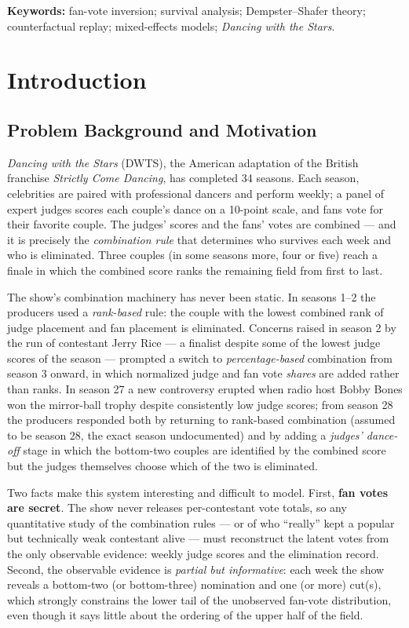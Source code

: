 \documentclass[10pt]{article}
\begin{document}
\textbf{Keywords:} fan-vote inversion; survival analysis; Dempster--Shafer theory;
counterfactual replay; mixed-effects models; \textit{Dancing with the Stars}.

\section{Introduction}

\subsection{Problem Background and Motivation}

\textit{Dancing with the Stars} (DWTS), the American adaptation of the British franchise
\textit{Strictly Come Dancing}, has completed 34 seasons. Each season, celebrities are
paired with professional dancers and perform weekly; a panel of expert judges scores each
couple's dance on a 10-point scale, and fans vote for their favorite couple. The judges'
scores and the fans' votes are combined --- and it is precisely the \emph{combination rule}
that determines who survives each week and who is eliminated. Three couples (in some
seasons more, four or five) reach a finale in which the combined score ranks the remaining
field from first to last.

The show's combination machinery has never been static. In seasons 1--2 the producers used
a \emph{rank-based} rule: the couple with the lowest combined rank of judge placement and
fan placement is eliminated. Concerns raised in season 2 by the run of contestant Jerry
Rice --- a finalist despite some of the lowest judge scores of the season --- prompted a
switch to \emph{percentage-based} combination from season 3 onward, in which normalized
judge and fan vote \emph{shares} are added rather than ranks. In season 27 a new
controversy erupted when radio host Bobby Bones won the mirror-ball trophy despite
consistently low judge scores; from season 28 the producers responded both by returning to
rank-based combination (assumed to be season 28, the exact season undocumented) and by
adding a \emph{judges' dance-off} stage in which the bottom-two couples are identified by
the combined score but the judges themselves choose which of the two is eliminated.

Two facts make this system interesting and difficult to model. First, \textbf{fan votes are
secret}. The show never releases per-contestant vote totals, so any quantitative study of
the combination rules --- or of who ``really'' kept a popular but technically weak
contestant alive --- must reconstruct the latent votes from the only observable evidence:
weekly judge scores and the elimination record. Second, the observable evidence is
\emph{partial but informative}: each week the show reveals a bottom-two (or bottom-three)
nomination and one (or more) cut(s), which strongly constrains the lower tail of the
unobserved fan-vote distribution, even though it says little about the ordering of the
upper half of the field.
\end{document}
